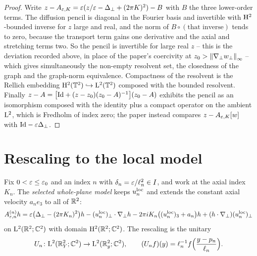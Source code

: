\begin{proof}
  \leanok
  Write $z-A_{\varepsilon,K}=\varepsilon(z/\varepsilon-\Delta_\perp+(2\pi K)^2)-B$ with $B$ the three
  lower-order terms.  The diffusion pencil is diagonal in the Fourier basis and invertible
  with $\mathrm{H}^2$-bounded inverse for $z$ large and real, and the norm of
  $B\circ(\text{that inverse})$ tends to zero, because the transport term gains one
  derivative and the axial and stretching terms two.  So the pencil is invertible for
  large real $z$ -- this is the deviation recorded above, in place of the paper's
  coercivity at $z_0>\left\|\nabla_\perp w_\perp\right\|_\infty$ -- which gives simultaneously the
  non-empty resolvent set, the closedness of the graph and the graph-norm equivalence.
  Compactness of the resolvent is the Rellich embedding
  $\mathrm{H}^2(\mathbb{T}^2)\hookrightarrow\mathrm{L}^2(\mathbb{T}^2)$ composed with the bounded resolvent.  Finally
  $z-A=\bigl[\mathrm{Id}+(z-z_0)(z_0-A)^{-1}\bigr](z_0-A)$ exhibits the pencil as an isomorphism
  composed with the identity plus a compact operator on the ambient $\mathrm{L}^2$, which is
  Fredholm of index zero; the paper instead compares $z-A_{\varepsilon,K}[w]$ with
  $\mathrm{Id}-\varepsilon\Delta_\perp$.
\end{proof}

\section{Rescaling to the local model}

\begin{definition}
  \label{def:operator:selected-whole-plane}
  \leanok
  Fix $0<\varepsilon\leq\varepsilon_0$ and an index $n$ with $\delta_n=\varepsilon/\ell_n^2\in I$, and work at
  the axial index $K_n$.  The \emph{selected whole-plane model} keeps $u_n^{\rm loc}$ and
  extends the constant axial velocity $a_ne_3$ to all of $\mathbb{R}^2$:
  \begin{equation}
    A^{(n)}_{\varepsilon,n}h=\varepsilon\bigl(\Delta_\perp-(2\pi K_n)^2\bigr)h
      -(u_n^{\rm loc})_\perp\cdot\nabla_\perp h
      -2\pi iK_n\bigl((u_n^{\rm loc})_3+a_n\bigr)h
      +(h\cdot\nabla_\perp)(u_n^{\rm loc})_\perp
    \label{eq:operator:selected-whole-plane}
  \end{equation}
  on $\mathrm{L}^2(\mathbb{R}^2;\mathbb{C}^2)$ with domain $\mathrm{H}^2(\mathbb{R}^2;\mathbb{C}^2)$.  The rescaling is the unitary
  \[
    U_n\colon\mathrm{L}^2(\mathbb{R}^2_Y;\mathbb{C}^2)\to\mathrm{L}^2(\mathbb{R}^2_y;\mathbb{C}^2),
    \qquad(U_nf)(y)=\ell_n^{-1}f\Bigl(\frac{y-p_n}{\ell_n}\Bigr).
  \]
\end{definition}


